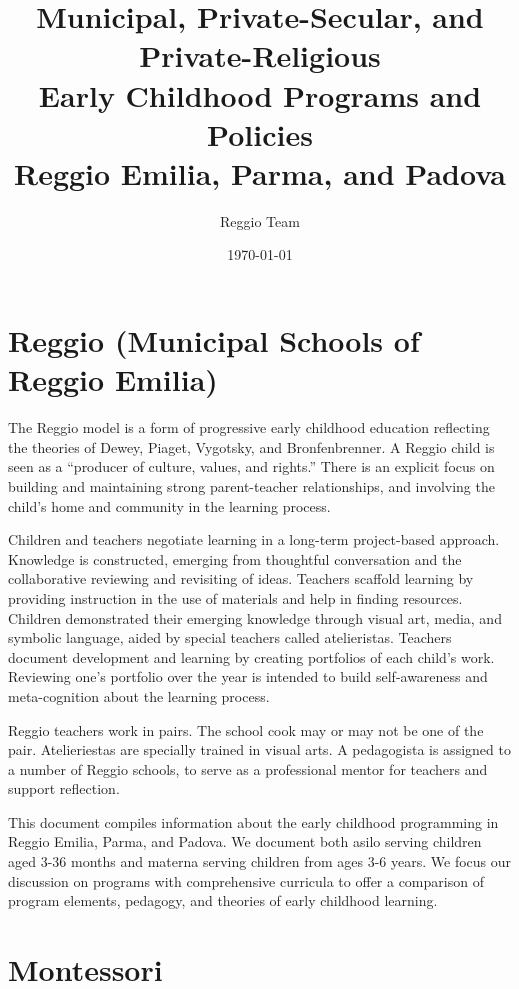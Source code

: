 \documentclass{article}
\title{Municipal, Private-Secular, and Private-Religious \\ Early Childhood Programs and Policies\\[15pt] Reggio Emilia, Parma, and Padova}
\author{Reggio Team}
\date{\today}
\theoremstyle{definition}
\theoremstyle{remark}
\begin{document}
\maketitle

\doublespacing

\section{Reggio (Municipal Schools of Reggio Emilia)}

The Reggio model is a form of progressive early childhood education reflecting the theories of Dewey, Piaget, Vygotsky, and Bronfenbrenner. A Reggio child is seen as a ``producer of culture, values, and rights.'' There is an explicit focus on building and maintaining strong parent-teacher relationships, and involving the child's home and community in the learning process. 

Children and teachers negotiate learning in a long-term project-based approach. Knowledge is constructed, emerging from thoughtful conversation and the collaborative reviewing and revisiting of ideas. Teachers scaffold learning by providing instruction in the use of materials and help in finding resources. Children demonstrated their emerging knowledge through visual art, media, and symbolic language, aided by special teachers called atelieristas. Teachers document development and learning by creating portfolios of each child's work. Reviewing one's portfolio over the year is intended to build self-awareness and meta-cognition about the learning process. 

Reggio teachers work in pairs. The school cook may or may not be one of the pair. Atelieriestas are specially trained in visual arts. A pedagogista is assigned to a number of Reggio schools, to serve as a professional mentor for teachers and support reflection. 


This document compiles information about the early childhood programming in Reggio Emilia, Parma, and Padova. We document both asilo serving children aged 3-36 months and materna serving children from ages 3-6 years. We focus our discussion on programs with comprehensive curricula to offer a comparison of program elements, pedagogy, and theories of early childhood learning. 

\section{Montessori}
\end{document}
